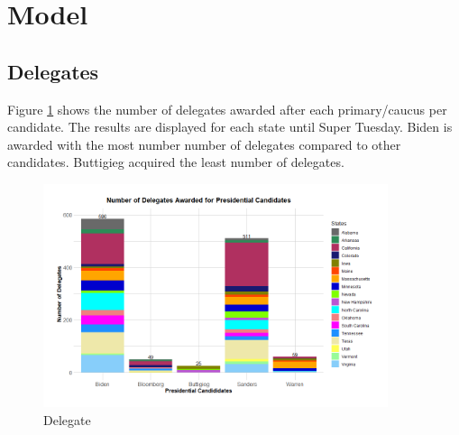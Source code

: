 \section{Model}\label{model}
\subsection{Delegates}
Figure \ref{Delegate} shows the number of delegates awarded after each primary/caucus per candidate. The results are displayed for each state until Super Tuesday. Biden is awarded with the most number number of delegates compared to other candidates. Buttigieg acquired the least number of delegates. 
\begin{figure}[H]
    \centering
    \includegraphics[width=0.9\textwidth]{figures/Delegate.png}
    \caption{Delegate}
    \label{Delegate}
\end{figure}

